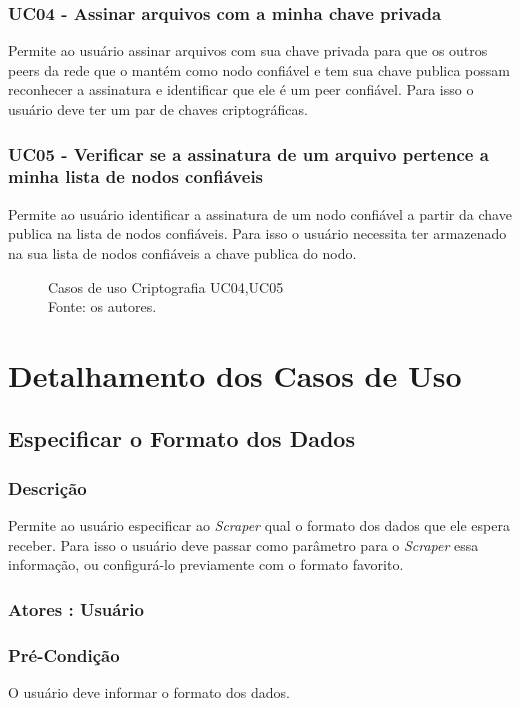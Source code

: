 \subsubsection{UC04 - Assinar arquivos com a minha chave privada}
Permite ao usuário assinar arquivos com sua chave privada para que os outros peers da rede que o mantém como nodo confiável e tem sua chave publica possam reconhecer a assinatura e identificar que ele é um peer confiável. Para isso o usuário deve ter um par de chaves criptográficas.
\subsubsection{UC05 - Verificar se a assinatura de um arquivo pertence a minha lista de nodos confiáveis}
Permite ao usuário identificar a assinatura de um nodo confiável a partir da chave publica na lista de nodos confiáveis. Para isso o usuário necessita ter armazenado na sua lista de nodos confiáveis a chave publica do nodo.
\begin{figure}[H]
    \centering
    
    \caption[Casos de uso Criptografia UC04,UC05]{\label{fig:Ator_Crypto2}
        Casos de uso Criptografia UC04,UC05\\
        Fonte: os autores.
    }
\end{figure}
\section{Detalhamento dos Casos de Uso}

\subsection{Especificar o Formato dos Dados}
\subsubsection{Descrição}
Permite ao usuário especificar ao \textit{Scraper} qual o formato dos dados que ele espera receber. Para isso o usuário deve passar como parâmetro para o \textit{Scraper} essa informação, ou configurá-lo previamente com o formato favorito.
\subsubsection{Atores : Usuário}
\subsubsection{Pré-Condição}
O usuário deve informar o formato dos dados.
